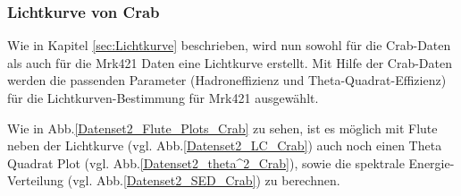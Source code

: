 \subsubsection{Lichtkurve von Crab}
Wie in Kapitel \ref{sec:Lichtkurve} beschrieben, wird nun sowohl für die Crab-Daten als auch für die Mrk421 Daten eine Lichtkurve erstellt.
Mit Hilfe der Crab-Daten werden die passenden Parameter (Hadroneffizienz und Theta-Quadrat-Effizienz) für die Lichtkurven-Bestimmung für Mrk421 ausgewählt.

Wie in Abb.\ref{Datenset2_Flute_Plots_Crab} zu sehen, ist es möglich mit Flute neben der Lichtkurve (vgl. Abb.\ref{Datenset2_LC_Crab}) auch noch einen Theta Quadrat Plot (vgl. Abb.\ref{Datenset2_theta^2_Crab}), sowie die spektrale Energie-Verteilung (vgl. Abb.\ref{Datenset2_SED_Crab}) zu berechnen.

